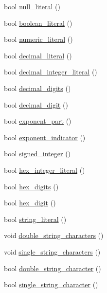 \begin{DoxyCompactItemize}
\item 
bool \hyperlink{class_lexical_grammar_a2bd963802a60b5d0e1476bdf3019494b}{null\+\_\+literal} ()
\item 
bool \hyperlink{class_lexical_grammar_a80b7dcb7b99bbd553581cd162cd80cb1}{boolean\+\_\+literal} ()
\item 
bool \hyperlink{class_lexical_grammar_a6dd9a9a8baf50e9a99e0df2cbaa8d795}{numeric\+\_\+literal} ()
\item 
bool \hyperlink{class_lexical_grammar_aa4b1f1f944befbe96ee450a0399e85df}{decimal\+\_\+literal} ()
\item 
bool \hyperlink{class_lexical_grammar_afb8b57c8a9457981b9d99704ee78c066}{decimal\+\_\+integer\+\_\+literal} ()
\item 
bool \hyperlink{class_lexical_grammar_a434f04e5a69d078a98dcf9163835dad0}{decimal\+\_\+digits} ()
\item 
bool \hyperlink{class_lexical_grammar_a013dbcda735a0c6c61970de8bd65c0fe}{decimal\+\_\+digit} ()
\item 
bool \hyperlink{class_lexical_grammar_a295f7a8841c4b098113e0a43401488fc}{exponent\+\_\+part} ()
\item 
bool \hyperlink{class_lexical_grammar_a45135be3081ddcdbb776555a6819d45f}{exponent\+\_\+indicator} ()
\item 
bool \hyperlink{class_lexical_grammar_a97e84269213615dc97e8622fc96d0f4c}{signed\+\_\+integer} ()
\item 
bool \hyperlink{class_lexical_grammar_aca046d0a2eacbece1c05fb59548efdbd}{hex\+\_\+integer\+\_\+literal} ()
\item 
bool \hyperlink{class_lexical_grammar_aeace42ff820851c2d59b3d0582cb2e5d}{hex\+\_\+digits} ()
\item 
bool \hyperlink{class_lexical_grammar_afa260bdb5dc9224215a68ba07cce3a4a}{hex\+\_\+digit} ()
\item 
bool \hyperlink{class_lexical_grammar_a11294149e962d00a92cacc8c6567cdc5}{string\+\_\+literal} ()
\item 
void \hyperlink{class_lexical_grammar_a390981ebfe1b2819225b04e65ac1aae0}{double\+\_\+string\+\_\+characters} ()
\item 
void \hyperlink{class_lexical_grammar_aa7f181acaa775e99a212d2e357cae599}{single\+\_\+string\+\_\+characters} ()
\item 
bool \hyperlink{class_lexical_grammar_a473842f8e78b003d65e4459eec57bf8d}{double\+\_\+string\+\_\+character} ()
\item 
bool \hyperlink{class_lexical_grammar_ae052b9eae96cf939b760c0f5e6cdfdfa}{single\+\_\+string\+\_\+character} ()

\end{DoxyCompactItemize}
